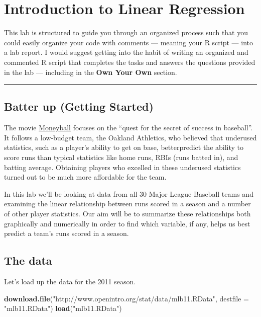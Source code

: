 \documentclass[]{book}
\newenvironment{Shaded}{\begin{snugshade}}{\end{snugshade}}
\newcommand{\KeywordTok}[1]{\textcolor[rgb]{0.13,0.29,0.53}{\textbf{#1}}}
\newcommand{\DataTypeTok}[1]{\textcolor[rgb]{0.13,0.29,0.53}{#1}}
\newcommand{\StringTok}[1]{\textcolor[rgb]{0.31,0.60,0.02}{#1}}
\newcommand{\NormalTok}[1]{#1}
\theoremstyle{definition}
\theoremstyle{definition}
\theoremstyle{definition}
\theoremstyle{remark}
\begin{document}
\chapter{Introduction to Linear
Regression}\label{introduction-to-linear-regression}

This lab is structured to guide you through an organized process such
that you could easily organize your code with comments --- meaning your
R script --- into a lab report. I would suggest getting into the habit
of writing an organized and commented R script that completes the tasks
and answers the questions provided in the lab --- including in the
\textbf{Own Your Own} section.

\begin{center}\rule{0.5\linewidth}{\linethickness}\end{center}

\section{Batter up (Getting Started)}\label{batter-up-getting-started}

The movie
\href{http://en.wikipedia.org/wiki/Moneyball_(film)}{Moneyball} focuses
on the ``quest for the secret of success in baseball''. It follows a
low-budget team, the Oakland Athletics, who believed that underused
statistics, such as a player's ability to get on base, betterpredict the
ability to score runs than typical statistics like home runs, RBIs (runs
batted in), and batting average. Obtaining players who excelled in these
underused statistics turned out to be much more affordable for the team.

In this lab we'll be looking at data from all 30 Major League Baseball
teams and examining the linear relationship between runs scored in a
season and a number of other player statistics. Our aim will be to
summarize these relationships both graphically and numerically in order
to find which variable, if any, helps us best predict a team's runs
scored in a season.

\section{The data}\label{the-data-4}

Let's load up the data for the 2011 season.

\begin{Shaded}
\begin{Highlighting}[]
\KeywordTok{download.file}\NormalTok{(}\StringTok{"http://www.openintro.org/stat/data/mlb11.RData"}\NormalTok{, }\DataTypeTok{destfile =} \StringTok{"mlb11.RData"}\NormalTok{)}
\KeywordTok{load}\NormalTok{(}\StringTok{"mlb11.RData"}\NormalTok{)}
\end{Highlighting}
\end{Shaded}
\end{document}
